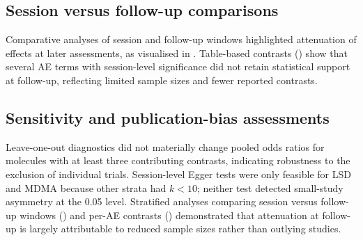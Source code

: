 \subsection{Session versus follow-up comparisons}
Comparative analyses of session and follow-up windows highlighted attenuation of effects at later assessments, as visualised in . Table-based contrasts () show that several AE terms with session-level significance did not retain statistical support at follow-up, reflecting limited sample sizes and fewer reported contrasts.


\subsection{Sensitivity and publication-bias assessments}
Leave-one-out diagnostics did not materially change pooled odds ratios for molecules with at least three contributing contrasts, indicating robustness to the exclusion of individual trials. Session-level Egger tests were only feasible for LSD and MDMA because other strata had $k<10$; neither test detected small-study asymmetry at the 0.05 level. Stratified analyses comparing session versus follow-up windows () and per-AE contrasts () demonstrated that attenuation at follow-up is largely attributable to reduced sample sizes rather than outlying studies.
